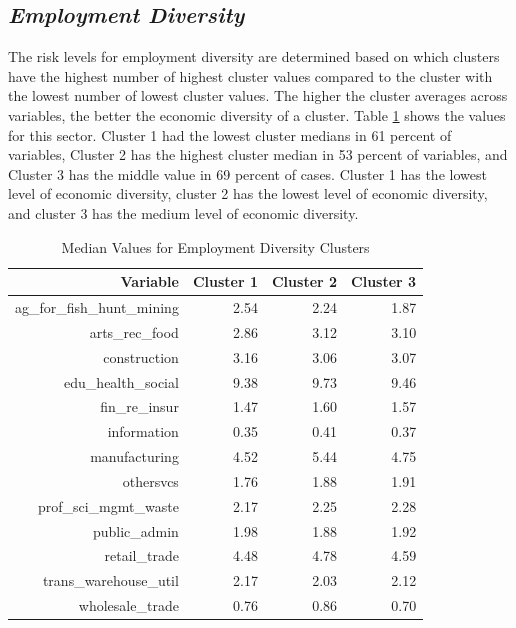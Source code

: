\subsection{\textit{Employment Diversity}}
The risk levels for employment diversity are determined based on which clusters have the highest number of highest cluster values compared to the cluster with the lowest number of lowest cluster values. The higher the cluster averages across variables, the better the economic diversity of a cluster. Table \ref{tab:emp} shows the values for this sector. 
Cluster 1 had the lowest cluster medians in 61 percent of variables, 
Cluster 2 has the highest cluster median in 53 percent of variables, and Cluster 3 has the middle value in 69 %
percent of cases. Cluster 1 has the lowest level of economic diversity, cluster 2 has the lowest level of economic diversity, and cluster 3 has the medium level of economic diversity. 

\begin{table}[ht]
    \centering
    \caption{Median Values for Employment Diversity Clusters}
    \label{tab:emp}
    \begin{tabular}{|r| r| r| r|}
        \hline
        Variable & Cluster 1 & Cluster 2 & Cluster 3 \\ 
        \hline
        \hline
        ag\_for\_fish\_hunt\_mining & 2.54 & 2.24 & 1.87 \\ 
        \hline
        arts\_rec\_food & 2.86 & 3.12 & 3.10 \\ 
        \hline
        construction & 3.16 & 3.06 & 3.07 \\ 
        \hline
        edu\_health\_social & 9.38 & 9.73 & 9.46 \\ 
        \hline
        fin\_re\_insur & 1.47 & 1.60 & 1.57 \\ 
        \hline
        information & 0.35 & 0.41 & 0.37 \\ 
        \hline
        manufacturing & 4.52 & 5.44 & 4.75 \\ 
        \hline
        othersvcs & 1.76 & 1.88 & 1.91 \\ 
        \hline
        prof\_sci\_mgmt\_waste & 2.17 & 2.25 & 2.28 \\ 
        \hline
        public\_admin & 1.98 & 1.88 & 1.92 \\ 
        \hline
        retail\_trade & 4.48 & 4.78 & 4.59 \\ 
        \hline
        trans\_warehouse\_util & 2.17 & 2.03 & 2.12 \\ 
        \hline
        wholesale\_trade & 0.76 & 0.86 & 0.70 \\ 
        \hline
    \end{tabular}
\end{table}

